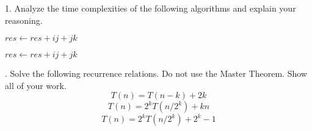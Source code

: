 \problem{}

1. Analyze the time complexities of the following algorithms and explain your reasoning.

\begin{algorithm}
\caption{}
\begin{algorithmic}
            \State $res \gets res + ij + jk$
        \EndFor
    \EndFor
\EndFor
\end{algorithmic}
\end{algorithm}


\begin{algorithm}
\caption{}
\begin{algorithmic}
            \State $res \gets res + ij + jk$
        \EndFor
    \EndFor
\EndFor
\end{algorithmic}
\end{algorithm}

. Solve the following recurrence relations. Do not use the Master Theorem. Show all of your work.
$$T(n) = T(n-k) + 2k$$
$$T(n) = 2^kT(n/2^k) + kn$$
$$T(n) = 2^kT(n/2^k) + 2^k-1$$


\solution{
 
}
\newpage